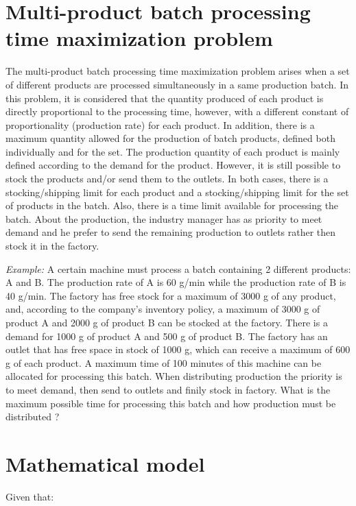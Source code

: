 \documentclass[authoryear,manuscript,12pt]{elsarticle}
\begin{document}
\section{Multi-product batch processing time maximization problem}
\label{sec:MBPTMP}

The multi-product batch processing time maximization problem arises when a set of different products are processed simultaneously in a same production batch. In this problem, it is considered that the quantity produced of each product is directly proportional to the processing time, however, with a different constant of proportionality (production rate) for each product. In addition, there is a maximum quantity allowed for the production of batch products, defined both individually and for the set. The production quantity of each product is mainly defined according to the demand for the product. However, it is still possible to stock the products and/or send them to the outlets. In both cases, there is a stocking/shipping limit for each product and a stocking/shipping limit for the set of products in the batch. Also, there is a time limit available for processing the batch. About the production, the industry manager has as priority to meet demand and he prefer to send the remaining production to outlets rather then stock it in the factory. 

\emph{Example:} A certain machine must process a batch containing 2 different products: A and B. The production rate of A is 60 g/min while the production rate of B is 40 g/min. The factory has free stock for a maximum of 3000 g of any product, and, according to the company's inventory policy, a maximum of 3000 g of product A and 2000 g of product B can be stocked at the factory. There is a demand for 1000 g of product A and 500 g of product B. The factory has an outlet that has free space in stock of 1000 g, which can receive a maximum of 600 g of each product. A maximum time of 100 minutes of this machine can be allocated for processing this batch. When distributing production the priority is to meet demand, then send to outlets and finily stock in factory. What is the maximum possible time for processing this batch and how production must be distributed ? 

\section{Mathematical model}
\label{sec:mathModel}

Given that:
\end{document}

